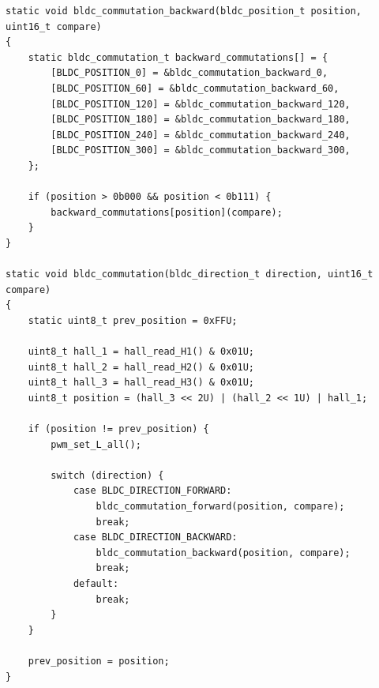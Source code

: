 \documentclass[11pt]{article}
\begin{document}
\begin{lstlisting}[language=Ccustom, caption=Fragment programu w C99 realizujacy sterowanie silnikiem BLDC]
static void bldc_commutation_backward(bldc_position_t position, uint16_t compare)
{
    static bldc_commutation_t backward_commutations[] = {
        [BLDC_POSITION_0] = &bldc_commutation_backward_0,
        [BLDC_POSITION_60] = &bldc_commutation_backward_60,
        [BLDC_POSITION_120] = &bldc_commutation_backward_120,
        [BLDC_POSITION_180] = &bldc_commutation_backward_180,
        [BLDC_POSITION_240] = &bldc_commutation_backward_240,
        [BLDC_POSITION_300] = &bldc_commutation_backward_300,
    };

    if (position > 0b000 && position < 0b111) {
        backward_commutations[position](compare);
    }
}

static void bldc_commutation(bldc_direction_t direction, uint16_t compare)
{
    static uint8_t prev_position = 0xFFU;

    uint8_t hall_1 = hall_read_H1() & 0x01U;
    uint8_t hall_2 = hall_read_H2() & 0x01U;
    uint8_t hall_3 = hall_read_H3() & 0x01U;
    uint8_t position = (hall_3 << 2U) | (hall_2 << 1U) | hall_1;

    if (position != prev_position) {
        pwm_set_L_all();

        switch (direction) {
            case BLDC_DIRECTION_FORWARD:
                bldc_commutation_forward(position, compare);
                break;
            case BLDC_DIRECTION_BACKWARD:
                bldc_commutation_backward(position, compare);
                break;
            default:
                break;
        }
    }

    prev_position = position;
}
\end{lstlisting}
\end{document}
